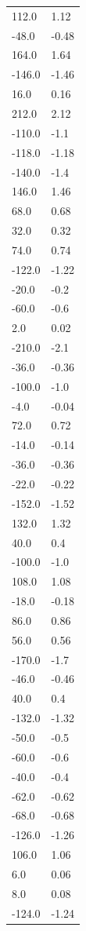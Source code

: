 \begin{longtable}{ll}
112.0 & 1.12 \\
-48.0 & -0.48 \\
164.0 & 1.64 \\
-146.0 & -1.46 \\
16.0 & 0.16 \\
212.0 & 2.12 \\
-110.0 & -1.1 \\
-118.0 & -1.18 \\
-140.0 & -1.4 \\
146.0 & 1.46 \\
68.0 & 0.68 \\
32.0 & 0.32 \\
74.0 & 0.74 \\
-122.0 & -1.22 \\
-20.0 & -0.2 \\
-60.0 & -0.6 \\
2.0 & 0.02 \\
-210.0 & -2.1 \\
-36.0 & -0.36 \\
-100.0 & -1.0 \\
-4.0 & -0.04 \\
72.0 & 0.72 \\
-14.0 & -0.14 \\
-36.0 & -0.36 \\
-22.0 & -0.22 \\
-152.0 & -1.52 \\
132.0 & 1.32 \\
40.0 & 0.4 \\
-100.0 & -1.0 \\
108.0 & 1.08 \\
-18.0 & -0.18 \\
86.0 & 0.86 \\
56.0 & 0.56 \\
-170.0 & -1.7 \\
-46.0 & -0.46 \\
40.0 & 0.4 \\
-132.0 & -1.32 \\
-50.0 & -0.5 \\
-60.0 & -0.6 \\
-40.0 & -0.4 \\
-62.0 & -0.62 \\
-68.0 & -0.68 \\
-126.0 & -1.26 \\
106.0 & 1.06 \\
6.0 & 0.06 \\
8.0 & 0.08 \\
-124.0 & -1.24 \\

\end{longtable}
